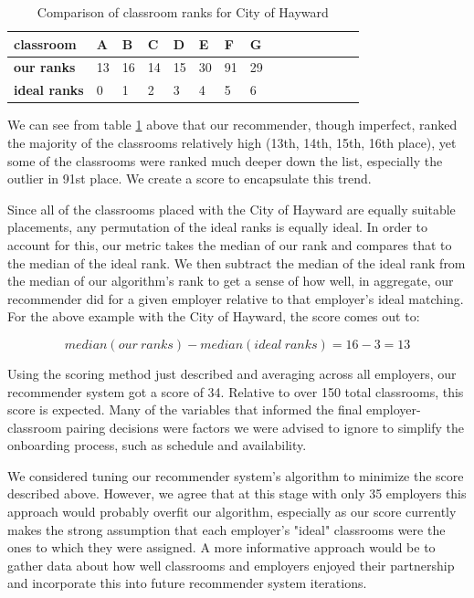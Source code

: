 \begin{table}[H]
\begin{center}
\begin{tabular}{|l|l|l|l|l|l|l|l|l|l|l|l|l|l|l|}
\hline
\textbf{classroom}   & A  & B  & C  & D   & E & F & G  \\
\hline
\textbf{our ranks}   &  13 & 16 & 14 & 15 & 30 & 91 & 29  \\
\hline
\textbf{ideal ranks} & 0  & 1  & 2   & 3   & 4 & 5 & 6   \\
\hline
\end{tabular}
\end{center}
\caption{Comparison of classroom ranks for City of Hayward}
\label{tab:comp}
\end{table}


We can see from table \ref{tab:comp} above that our recommender, though imperfect, ranked the majority of the classrooms relatively high (13th, 14th, 15th, 16th place), yet some of the classrooms were ranked much deeper down the list, especially the outlier in 91st place. We create a score to encapsulate this trend.

Since all of the classrooms placed with the City of Hayward are equally suitable placements, any permutation of the ideal ranks is equally ideal. In order to account for this, our metric takes the median of our rank and compares that to the median of the ideal rank. We then subtract the median of the ideal rank from the median of our algorithm's rank to get a sense of how well, in aggregate, our recommender did for a given employer relative to that employer's ideal matching. For the above example with the City of Hayward, the score comes out to: 

$$ median(our\ ranks) - median(ideal\ ranks) = 16 - 3 = 13$$

Using the scoring method just described and averaging across all employers, our recommender system got a score of 34. Relative to over 150 total classrooms, this score is expected. Many of the variables that informed the final employer-classroom pairing decisions were factors we were advised to ignore to simplify the onboarding process, such as schedule and availability.

We considered tuning our recommender system's algorithm to minimize the score described above. However, we agree that at this stage with only 35 employers this approach would probably overfit our algorithm, especially as our score currently makes the strong assumption that each employer's "ideal" classrooms were the ones to which they were assigned. A more informative approach would be to gather data about how well classrooms and employers enjoyed their partnership and incorporate this into future recommender system iterations.

